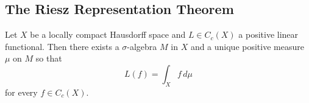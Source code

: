 \subsection{The Riesz Representation Theorem}

\begin{theorem}\label{thm:riesz_representation}
    Let \( X \) be a locally compact Hausdorff space and \( L \in C_c(X) \) a positive linear functional. Then there
    exists a \( \sigma \)-algebra \( M \) in \( X \) and a unique positive measure \( \mu \) on \( M \) so that
    \[
        L(f) = \int_X f\,d\mu
    \]
    for every \( f \in C_c(X) \).
\end{theorem}
\bigskip
